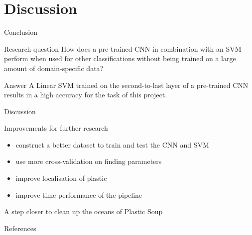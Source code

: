 \documentclass{beamer}
\begin{document}
\section{Discussion}
    \begin{frame}{Conclusion}
        \begin{block}{Research question}
        How does a pre-trained CNN in combination with an SVM perform when used for other classifications without being trained on a large amount of domain-specific data?
        \end{block}
        \begin{block}{Answer}
        A Linear SVM trained on the second-to-last layer of a pre-trained CNN results in a high accuracy for the task of this project.
        \end{block}
    \end{frame}

    \begin{frame}{Discussion}
        \begin{block}{Improvements for further research}
            \begin{itemize}
            \item construct a better dataset to train and test the CNN and SVM
            \item use more cross-validation on finding parameters
            \item improve localisation of plastic
            \item improve time performance of the pipeline
            \end{itemize}
        \end{block}
        \begin{block}{}
        \Large A step closer to clean up the oceans of Plastic Soup
        \end{block}
    \end{frame}

    \begin{frame}[allowframebreaks]{References}
        
        
    \end{frame}
\end{document}
